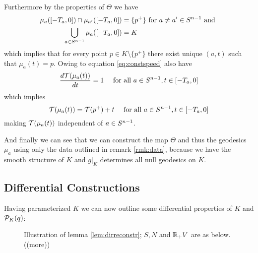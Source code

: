 Furthermore by the properties of $\Theta$ we have 
\begin{align}
    \mu_a([-T_a,0])\cap \mu_{a'}([-T_a,0]) &= \{p^+\} \text{ for } a\neq a'\in {S^{n-1}} \text{ and }\\
    \bigcup_{a\in {S^{n-1}}}\mu_a([-T_a,0]) &= K
\end{align} which implies that for every point $p\in K\setminus \{p^+\}$ there exist unique $(a,t)$ such that $\mu_a(t)=p$. Owing to equation \ref{eq:constspeed} also have 
\begin{equation}\label{eq:muspeed}
    \frac{d{\mathcal{T}}(\mu_a(t))}{dt} = 1 \quad \text{ for all }a\in {S^{n-1}}, t\in [-T_a,0]
\end{equation}which implies 
\begin{equation}\label{eq:Teq}
    {\mathcal{T}}(\mu_a(t)) = {\mathcal{T}}(p^+)+t \quad \text{ for all }a\in {S^{n-1}}, t\in [-T_a,0]
\end{equation} making ${\mathcal{T}}(\mu_a(t))$ independent of $a\in {S^{n-1}}$.

And finally we can see that we can construct the map $\Theta$ and thus the geodesics $\mu_a$ using only the data outlined in remark \ref{rmk:data}, because we have the smooth structure of $K$ and $g\rvert_K$ determines all null geodesics on $K$.


\subsection{Differential Constructions}
Having parameterized $K$ we can now outline some differential properties of $K$ and ${\mathcal{P}}_K(q)$:

\begin{figure}\label{fig:DirReconstr}
    \centering
    
    \caption{Illustration of lemma \ref{lem:dirreconstr}; $S,N$ and $\mathbb{R}_+V$ are as below.((more))}
\end{figure}

